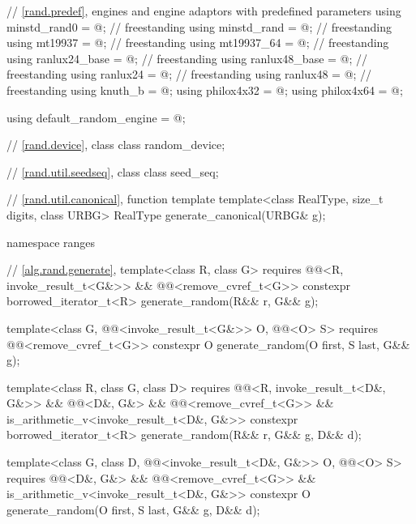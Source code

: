 \begin{codeblock}
{  // \ref{rand.predef}, engines and engine adaptors with predefined parameters
  using minstd_rand0  = @\seebelow@;      // freestanding
  using minstd_rand   = @\seebelow@;      // freestanding
  using mt19937       = @\seebelow@;      // freestanding
  using mt19937_64    = @\seebelow@;      // freestanding
  using ranlux24_base = @\seebelow@;      // freestanding
  using ranlux48_base = @\seebelow@;      // freestanding
  using ranlux24      = @\seebelow@;      // freestanding
  using ranlux48      = @\seebelow@;      // freestanding
  using knuth_b       = @\seebelow@;
  using philox4x32    = @\seebelow@;
  using philox4x64    = @\seebelow@;

  using default_random_engine = @\seebelow@;

  // \ref{rand.device}, class 
  class random_device;

  // \ref{rand.util.seedseq}, class 
  class seed_seq;

  // \ref{rand.util.canonical}, function template 
  template<class RealType, size_t digits, class URBG>
    RealType generate_canonical(URBG& g);

  namespace ranges {
    // \ref{alg.rand.generate}, 
    template<class R, class G>
      requires @@<R, invoke_result_t<G&>> &&
               @@<remove_cvref_t<G>>
      constexpr borrowed_iterator_t<R> generate_random(R&& r, G&& g);

    template<class G, @@<invoke_result_t<G&>> O, @@<O> S>
      requires @@<remove_cvref_t<G>>
      constexpr O generate_random(O first, S last, G&& g);

    template<class R, class G, class D>
      requires @@<R, invoke_result_t<D&, G&>> && @@<D&, G&> &&
               @@<remove_cvref_t<G>> &&
               is_arithmetic_v<invoke_result_t<D&, G&>>
    constexpr borrowed_iterator_t<R> generate_random(R&& r, G&& g, D&& d);

    template<class G, class D, @@<invoke_result_t<D&, G&>> O, @@<O> S>
      requires @@<D&, G&> && @@<remove_cvref_t<G>> &&
               is_arithmetic_v<invoke_result_t<D&, G&>>
    constexpr O generate_random(O first, S last, G&& g, D&& d);
  }

}
\end{codeblock}
